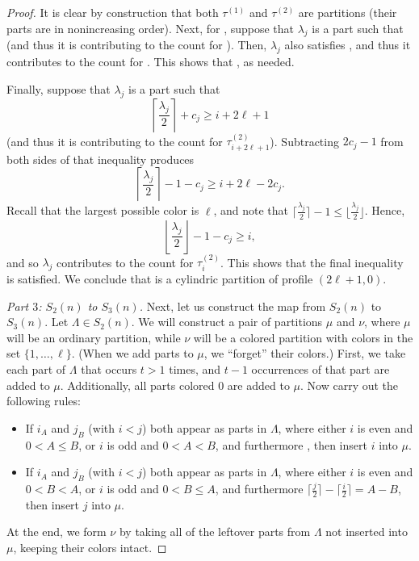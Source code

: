 \documentclass[10pt,a4paper]{amsart}
\numberwithin{equation}{section}
\theoremstyle{definition}
\begin{document}
\begin{proof}
It is clear by construction that both $\tau^{(1)}$ and $\tau^{(2)}$ are partitions (their parts are in nonincreasing order). Next, for , suppose that $\lambda_j$ is a part such that  (and thus it is contributing to the count for ). Then, $\lambda_j$ also satisfies , and thus it contributes to the count for . This shows that , as needed.

Finally, suppose that $\lambda_j$ is a part such that
\begin{equation*}
\left\lceil\frac {\lambda_j}2\right\rceil+c_j\ge i+2\ell+1
\end{equation*}
(and thus it is contributing to the count for $\tau^{(2)}_{i+2\ell+1}$). Subtracting $2c_j-1$ from both sides of that inequality produces
\begin{equation*}
\left\lceil\frac {\lambda_j}2\right\rceil-1-c_j\ge i+2\ell-2c_j.
\end{equation*}
Recall that the largest possible color is $\ell$, and note that $ \bigl\lceil\frac {\lambda_j}2\bigr\rceil-1\le\bigl\lfloor\frac {\lambda_j}2\bigr\rfloor$. Hence,
\begin{equation*}
\left\lfloor\frac {\lambda_j}2\right\rfloor-1-c_j\ge i,
\end{equation*}
and so $\lambda_j$ contributes to the count for $\tau^{(2)}_i$. This shows that the
final inequality  is satisfied. We conclude that  is a cylindric partition of profile $(2\ell+1,0)$.

{\it Part $3$: $S_2(n)$ to $S_3(n)$.} Next, let us construct the map from $S_2(n)$ to $S_3(n)$. Let $\Lambda \in S_2(n)$. We will construct a pair of partitions $\mu$ and $\nu$, where $\mu$ will be an ordinary partition, while $\nu$ will be a colored partition with colors in the set $\{1,\dots,\ell\}$. (When we add parts to $\mu$, we ``forget'' their colors.) First, we take each part of $\Lambda$ that occurs $t>1$ times, and $t-1$ occurrences of that part are added to $\mu$. Additionally, all parts colored 0 are added to $\mu$. Now carry out the following rules:
\begin{itemize}\itemsep=0pt
\item[$(R_1)$] If $i_{A}$ and $j_{B}$ (with $i<j$) both appear as parts in $\Lambda$, where either $i$ is even and $0<A \le B$, or $i$ is odd and $0 < A < B$, and furthermore
, then insert $i$ into $\mu$.
\item[$(R_2$)] If $i_{A}$ and $j_{B}$ (with $i<j$) both appear as parts in $\Lambda$, where either $i$ is even and $0<B< A$, or $i$ is odd and $0<B\le A$, and furthermore
$\bigl\lceil\frac j2\bigr\rceil-\bigl\lceil\frac i2\bigr\rceil=A-B$, then insert $j$ into $\mu$.
\end{itemize}
At the end, we form $\nu$ by taking all of the leftover parts from $\Lambda$ not inserted into $\mu$, keeping their colors intact.


\end{proof}
\end{document}
